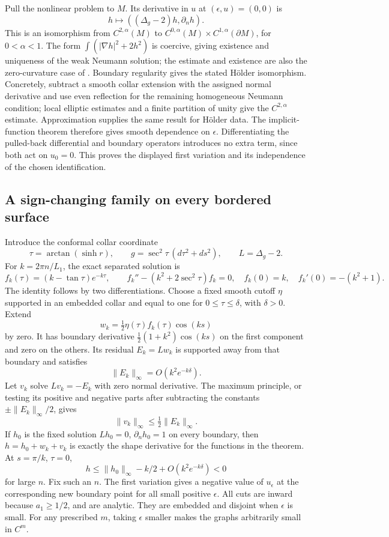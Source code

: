 \documentclass[11pt,a4paper]{article}
\theoremstyle{definition}
\begin{document}
Pull the nonlinear problem to $M$. Its derivative in $u$ at $(\epsilon,u)=(0,0)$ is
\[
 h\longmapsto((\Delta_g-2)h,\partial_nh).
\]
This is an isomorphism from $C^{2,\alpha}(M)$ to $C^{0,\alpha}(M)\times C^{1,\alpha}(\partial M)$, for $0<\alpha<1$. The form $\int(|\nabla h|^2+2h^2)$ is coercive, giving existence and uniqueness of the weak Neumann solution; the estimate and existence are also the zero-curvature case of \cite[Lemma~2.9(ii), equation~(2.22), pp.~3126--3127]{Rupflin}. Boundary regularity gives the stated H\"older isomorphism. Concretely, subtract a smooth collar extension with the assigned normal derivative and use even reflection for the remaining homogeneous Neumann condition; local elliptic estimates and a finite partition of unity give the $C^{2,\alpha}$ estimate. Approximation supplies the same result for H\"older data. The implicit-function theorem therefore gives smooth dependence on $\epsilon$. Differentiating the pulled-back differential and boundary operators introduces no extra term, since both act on $u_0=0$. This proves the displayed first variation and its independence of the chosen identification.

\subsection{A sign-changing family on every bordered surface}
Introduce the conformal collar coordinate
\[
 \tau=\arctan(\sinh r),\qquad
 g=\sec^2\tau\,(d\tau^2+ds^2),\qquad L=\Delta_g-2.
\]
For $k=2\pi n/L_1$, the exact separated solution is
\[
 f_k(\tau)=(k-\tan\tau)e^{-k\tau},\qquad
 f_k''-(k^2+2\sec^2\tau)f_k=0,
 \quad f_k(0)=k,\quad f_k'(0)=-(k^2+1).
\]
The identity follows by two differentiations. Choose a fixed smooth cutoff $\eta$ supported in an embedded collar and equal to one for $0\le\tau\le\delta$, with $\delta>0$. Extend
\[
 w_k=\tfrac12\eta(\tau)f_k(\tau)\cos(ks)
\]
by zero. It has boundary derivative $\tfrac12(1+k^2)\cos(ks)$ on the first component and zero on the others. Its residual $E_k=Lw_k$ is supported away from that boundary and satisfies
\[
                    \|E_k\|_\infty=O(k^2e^{-k\delta}).
\]
Let $v_k$ solve $Lv_k=-E_k$ with zero normal derivative. The maximum principle, or testing its positive and negative parts after subtracting the constants $\pm\|E_k\|_\infty/2$, gives
\[
                 \|v_k\|_\infty\le\tfrac12\|E_k\|_\infty.
\]
If $h_0$ is the fixed solution $Lh_0=0$, $\partial_nh_0=1$ on every boundary, then $h=h_0+w_k+v_k$ is exactly the shape derivative for the functions in the theorem. At $s=\pi/k$, $\tau=0$,
\[
 h\le\|h_0\|_\infty-k/2+O(k^2e^{-k\delta})<0
\]
for large $n$. Fix such an $n$. The first variation gives a negative value of $u_\epsilon$ at the corresponding new boundary point for all small positive $\epsilon$. All cuts are inward because $a_1\ge1/2$, and are analytic. They are embedded and disjoint when $\epsilon$ is small. For any prescribed $m$, taking $\epsilon$ smaller makes the graphs arbitrarily small in $C^m$.
\end{document}
